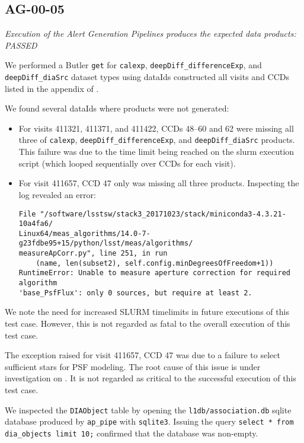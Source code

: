 \documentclass[DM,STR,toc]{lsstdoc}
\begin{document}
\subsection{AG-00-05}
\label{sect:ag-00-05}

\textit{Execution of the Alert Generation Pipelines produces the expected data products: PASSED}

We performed a Butler \texttt{get} for \texttt{calexp}, \texttt{deepDiff\_differenceExp}, and \texttt{deepDiff\_diaSrc} dataset types using dataIds constructed all visits and CCDs listed in the appendix of .

We found several dataIds where products were not generated:

\begin{itemize}
    \item For visits 411321, 411371, and 411422, CCDs 48--60 and 62 were missing all three of \texttt{calexp}, \texttt{deepDiff\_differenceExp}, and \texttt{deepDiff\_diaSrc} products.  This failure was due to the time limit being reached on the slurm execution script (which looped sequentially over CCDs for each visit).
    \item For visit 411657, CCD 47 only was missing all three products.  Inspecting the log revealed an error:
        \begin{verbatim}
File "/software/lsstsw/stack3_20171023/stack/miniconda3-4.3.21-10a4fa6/
Linux64/meas_algorithms/14.0-7-g23fdbe95+15/python/lsst/meas/algorithms/
measureApCorr.py", line 251, in run
    (name, len(subset2), self.config.minDegreesOfFreedom+1))
RuntimeError: Unable to measure aperture correction for required algorithm
'base_PsfFlux': only 0 sources, but require at least 2.
\end{verbatim}
\end{itemize}

We note the need for increased SLURM timelimits in future executions of this
test case. However, this is not regarded as fatal to the overall execution
of this test case.

The exception raised for visit 411657, CCD 47 was due to a failure to select
sufficient stars for PSF modeling. The root cause of this issue is under
investigation on . It is not regarded as critical to the
successful execution of this test case.

We inspected the \texttt{DIAObject} table by opening the
\texttt{l1db/association.db} sqlite database produced by \texttt{ap\_pipe}
with \texttt{sqlite3}. Issuing the query \texttt{select * from dia\_objects limit 10;} confirmed that the database was non-empty.
\end{document}
